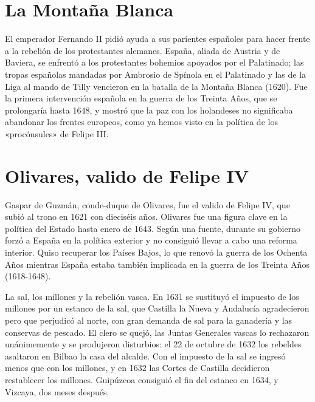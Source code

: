 \documentclass{book}
\begin{document}

\section{La Montaña Blanca}

El emperador Fernando II pidió ayuda a sus parientes españoles para hacer frente a la rebelión de los protestantes alemanes. España, aliada de Austria y de Baviera, se enfrentó a los protestantes bohemios apoyados por el Palatinado; las tropas españolas mandadas por Ambrosio de Spínola en el Palatinado y las de la Liga al mando de Tilly vencieron en la batalla de la Montaña Blanca (1620). Fue la primera intervención española en la guerra de los Treinta Años, que se prolongaría hasta 1648, y mostró que la paz con los holandeses no significaba abandonar los frentes europeos, como ya hemos visto en la política de los «procónsules» de Felipe III.


\section{Olivares, valido de Felipe IV}

Gaspar de Guzmán, conde-duque de Olivares, fue el valido de Felipe IV, que subió al trono en 1621 con dieciséis años. Olivares fue una figura clave en la política del Estado hasta enero de 1643. Según una fuente, durante su gobierno forzó a España en la política exterior y no consiguió llevar a cabo una reforma interior. Quiso recuperar los Países Bajos, lo que renovó la guerra de los Ochenta Años mientras España estaba también implicada en la guerra de los Treinta Años (1618-1648).


La sal, los millones y la rebelión vasca. En 1631 se sustituyó el impuesto de los millones por un estanco de la sal, que Castilla la Nueva y Andalucía agradecieron pero que perjudicó al norte, con gran demanda de sal para la ganadería y las conservas de pescado. El clero se quejó, las Juntas Generales vascas lo rechazaron unánimemente y se produjeron disturbios: el 22 de octubre de 1632 los rebeldes asaltaron en Bilbao la casa del alcalde. Con el impuesto de la sal se ingresó menos que con los millones, y en 1632 las Cortes de Castilla decidieron restablecer los millones. Guipúzcoa consiguió el fin del estanco en 1634, y Vizcaya, dos meses después.
\end{document}
